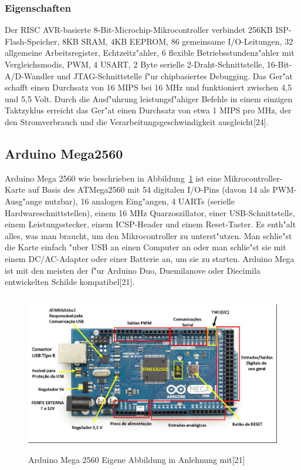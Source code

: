 \subsubsection{Eigenschaften}
Der RISC AVR-basierte 8-Bit-Microchip-Mikrocontroller 
verbindet 256KB ISP-Flash-Speicher, 8KB SRAM, 4KB EEPROM, 
86 gemeinsame I/O-Leitungen, 32 allgemeine Arbeitsregister, 
Echtzeitz"ahler, 6 flexible Betriebsstundenz"ahler mit Vergleichsmodis, 
PWM, 4 USART, 2 Byte serielle 2-Draht-Schnittstelle, 
16-Bit-A/D-Wandler und JTAG-Schnittstelle f"ur chipbasiertes Debugging. 
Das Ger"at schafft einen Durchsatz von 16 MIPS bei 16 MHz und 
funktioniert zwischen 4,5 und 5,5 Volt.
Durch die Ausf"uhrung leistungsf"ahiger Befehle 
in einem einzigen Taktzyklus erreicht das Ger"at einen 
Durchsatz von etwa 1 MIPS pro MHz, 
der den Stromverbrauch und 
die Verarbeitungsgeschwindigkeit ausgleicht[24].

\subsection{Arduino Mega2560}
Arduino Mega 2560 wie beschrieben in Abbildung~\ref{fig:Mega} ist eine Mikrocontroller-Karte auf 
Basis des ATMega2560 mit 54 
digitalen I/O-Pins (davon 14 als PWM-Ausg"ange nutzbar), 
16 analogen Eing"angen, 4 UARTs (serielle Hardwareschnittstellen), 
einem 16 MHz Quarzoszillator, 
einer USB-Schnittstelle, einem Leistungsstecker, 
einem ICSP-Header und einem Reset-Taster. Es enth"alt alles, 
was man braucht, um den Mikrocontroller zu unterst"utzen. 
Man schlie"st die Karte einfach "uber USB an einen Computer an oder man 
schlie"st sie mit einem DC/AC-Adapter oder einer Batterie an, 
um sie zu starten. Arduino Mega ist mit den meisten der 
f"ur Arduino Duo, Duemilanove oder 
Diecimila entwickelten Schilde kompatibel[21].

\begin{figure}[!htb]
\begin{center}
\includegraphics[height=7cm]{bilder/Mega.eps}
\end{center}
\caption{Arduino Mega 2560 Eigene Abbildung in Anlehnung mit[21]}\label{fig:Mega}
\end{figure}














